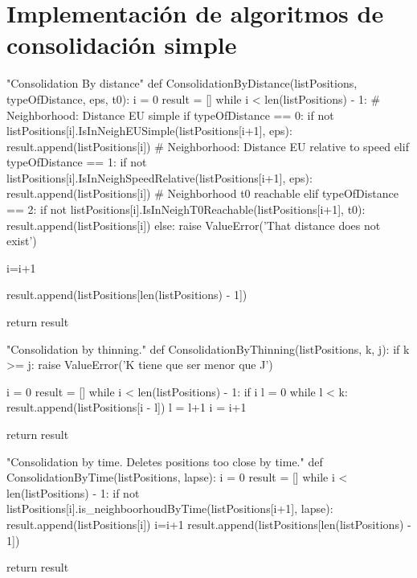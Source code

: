 \documentclass[a4paper, 12pt, spanish]{article}
\begin{document}
\newpage
\appendix

\section{Implementaci\'on de algoritmos de consolidaci\'on simple}\label{App:AppendixA}

\begin{python}[caption=Consolidaci\'on por distancia]\label{App:ConsByDistance}
"Consolidation By distance"
def ConsolidationByDistance(listPositions, typeOfDistance, eps, t0):
	i = 0
	result = []
	while i < len(listPositions) - 1:
		# Neighborhood: Distance EU simple
		if typeOfDistance == 0:
			if not listPositions[i].IsInNeighEUSimple(listPositions[i+1], eps):
				result.append(listPositions[i])
		# Neighborhood: Distance EU relative to speed
		elif typeOfDistance == 1:
			if not listPositions[i].IsInNeighSpeedRelative(listPositions[i+1], eps):
				result.append(listPositions[i])
		# Neighborhood t0 reachable
		elif typeOfDistance == 2:
			if not listPositions[i].IsInNeighT0Reachable(listPositions[i+1], t0):
				result.append(listPositions[i])
		else:
			raise ValueError('That distance does not exist')

		i=i+1

	result.append(listPositions[len(listPositions) - 1])

	return result

\end{python}


\newpage

\begin{python}[caption=Consolidaci\'on por adelgazamiento]\label{App:ConsByThinnig}
"Consolidation by thinning."
def ConsolidationByThinning(listPositions, k, j):
	if k >= j:
		raise ValueError('K tiene que ser menor que J')
        
	i = 0
	result = []
	while i < len(listPositions) - 1:
		if i%
			l = 0
			while l < k:
				result.append(listPositions[i - l])
				l = l+1
			i = i+1

	return result
\end{python}

\newpage

\begin{python}[caption=Consolidaci\'on por tiempo]\label{App:ConsByTime}
"Consolidation by time. Deletes positions too close by time."
def ConsolidationByTime(listPositions, lapse):
	i = 0
	result = []
	while i < len(listPositions) - 1:
		if not listPositions[i].is_neighboorhoudByTime(listPositions[i+1], lapse):
			result.append(listPositions[i])
		i=i+1
	result.append(listPositions[len(listPositions) - 1])

	return result
\end{python}
\end{document}
